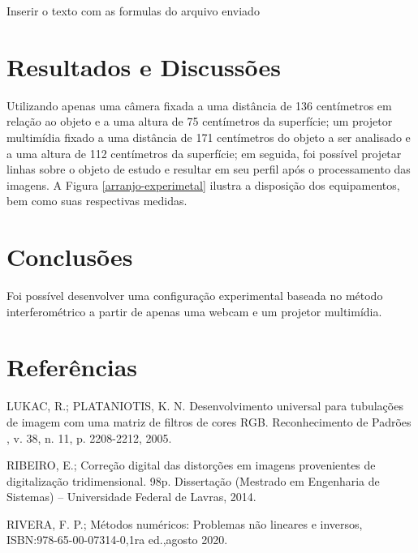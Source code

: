 \documentclass[a4paper, 12pt]{article}
\begin{document}
Inserir o texto com as formulas do arquivo enviado


\section{Resultados e Discussões}

Utilizando apenas uma câmera fixada a uma distância de 136 centímetros em relação ao objeto e a uma altura de 75 centímetros da superfície; um projetor multimídia fixado a uma distância de 171 centímetros do objeto a ser analisado e a uma altura de 112 centímetros da superfície; em seguida, foi possível projetar linhas sobre o objeto de estudo e resultar em seu perfil após o processamento das imagens. A Figura \ref{arranjo-experimetal} ilustra a disposição dos equipamentos, bem como suas respectivas medidas.


\section{Conclusões}


Foi possível desenvolver uma configuração experimental baseada no método interferométrico a partir de apenas uma webcam e um projetor multimídia. 


\section*{Referências}

LUKAC, R.; PLATANIOTIS, K. N. Desenvolvimento universal para tubulações de imagem com uma matriz de filtros de cores RGB. Reconhecimento de Padrões , v. 38, n. 11, p. 2208-2212, 2005.
\vspace{.5cm}

RIBEIRO, E.; Correção digital das distorções em imagens provenientes de digitalização tridimensional. 98p. Dissertação (Mestrado em Engenharia de Sistemas) – Universidade Federal de Lavras, 2014. 
\vspace{.5cm}

RIVERA, F. P.; Métodos numéricos: Problemas não lineares e inversos, ISBN:978-65-00-07314-0,1ra ed.,agosto 2020.
\vspace{.5cm}
\end{document}
